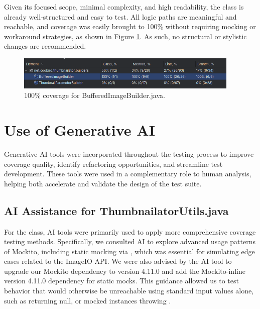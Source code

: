 \documentclass[12pt]{article}
\begin{document}
    Given its focused scope, minimal complexity, and high readability, the class
        is already well-structured and easy to test.
    All logic paths are meaningful and reachable, and coverage was easily
        brought to 100\% without requiring mocking or workaround
        strategies, as shown in Figure
        \ref{fig:buffered_image_builder_utils_100}.
    As such, no structural or stylistic changes are recommended.

    \begin{figure}[H]
        \centering
        \includegraphics[width=0.95\textwidth]{images/buffered_image_builder_100.png}
        \caption[100\% coverage for BufferedImageBuilder.java.]{100\% coverage for BufferedImageBuilder.java.}
        \label{fig:buffered_image_builder_utils_100}
    \end{figure}

    \section{Use of Generative AI}
    \markboth{}{}

    Generative AI tools were incorporated throughout the testing process to
        improve coverage quality, identify refactoring opportunities, and
        streamline test development.
    These tools were used in a complementary role to human analysis, helping
        both accelerate and validate the design of the test suite.

    \markboth{}{}
    \subsection{AI Assistance for ThumbnailatorUtils.java}
    \markboth{}{}

    For the  class, AI tools were primarily used
        to apply more comprehensive coverage testing methods.
    Specifically, we consulted AI to explore advanced usage patterns of Mockito,
        including static mocking via , which was essential
        for simulating edge cases related to the ImageIO API.
    We were also advised by the AI tool to upgrade our Mockito dependency to
        version 4.11.0 and add the Mockito-inline version 4.11.0 dependency for
        static mocks.
    This guidance allowed us to test behavior that would otherwise be
        unreachable using standard input values alone, such as
         returning null, or mocked
         instances throwing
        .
\end{document}
